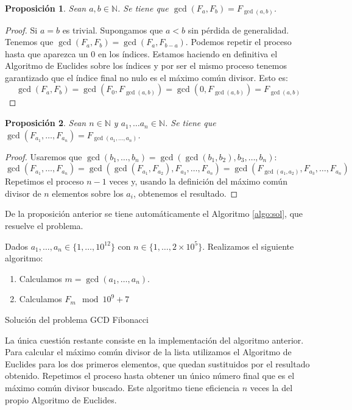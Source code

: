 \documentclass{article}
\theoremstyle{theorem-style}  %
\newtheorem{proposition}{Proposición}
\theoremstyle{definition}
\theoremstyle{example-style}
\begin{document}
    \begin{proposition}
        Sean $a, b \in \mathbb{N}$. Se tiene que $\gcd(F_a, F_b) = F_{\gcd(a, b)}$. 
    \end{proposition}
    \begin{proof}
        Si $a=b$ es trivial. Supongamos que $a < b$ sin pérdida de generalidad.
        Tenemos que $\gcd(F_a, F_b) = \gcd(F_a, F_{b-a})$. Podemos repetir el proceso hasta que aparezca un 0 en los índices. Estamos haciendo en definitiva el Algoritmo de Euclides sobre los índices y por ser el mismo proceso tenemos garantizado que el índice final no nulo es el máximo común divisor. Esto es:
        $$ \gcd(F_a, F_b) = \gcd(F_0, F_{\gcd(a,b)}) = \gcd(0, F_{\gcd(a,b)}) = F_{\gcd(a,b)} $$
    \end{proof}
    
    \begin{proposition}
        Sean $n \in \mathbb{N}$ y $a_1, \dots a_n \in \mathbb{N}$. Se tiene que 
        $\gcd(F_{a_1}, \dots, F_{a_n}) = F_{\gcd(a_1, \dots, a_n)}$. 
    \end{proposition}
    \begin{proof}
        Usaremos que $\gcd(b_1, \dots, b_n) = \gcd( \gcd(b_1, b_2), b_3, \dots, b_n)$:
        $$ \gcd(F_{a_1}, \dots, F_{a_n}) = \gcd(\gcd(F_{a_1},F_{a_2}), F_{a_3}, \dots, F_{a_n}) = \gcd(F_{\gcd(a_1, a_2)}, F_{a_3}, \dots, F_{a_n}) $$
        Repetimos el proceso $n-1$ veces y, usando la definición del máximo común divisor de $n$ elementos sobre los $a_i$, obtenemos el resultado.
    \end{proof}

    De la proposición anterior se tiene automáticamente el Algoritmo \ref{algo:sol}, que resuelve el problema.
    
    \begin{algorithm}
        Dados $a_1, \dots, a_n \in \{1, \dots, 10^{12}\}$ con $n \in \{1, \dots, 2\times10^5\}$. Realizamos el siguiente algoritmo:
        \begin{enumerate}
            \item Calculamos $m = \gcd(a_1, \dots, a_n)$.
            \item Calculamos $F_m \mod 10^9+7$
        \end{enumerate}
        \caption{Solución del problema GCD Fibonacci}
        \label{algo:sol}
    \end{algorithm}

    La única cuestión restante consiste en la implementación del algoritmo anterior. Para calcular el máximo común divisor de la lista utilizamos el Algoritmo de Euclides para los dos primeros elementos, que quedan sustituidos por el resultado obtenido. Repetimos el proceso hasta obtener un único número final que es el máximo común divisor buscado. Este algoritmo tiene eficiencia $n$ veces la del propio Algoritmo de Euclides. 
    
\end{document}

